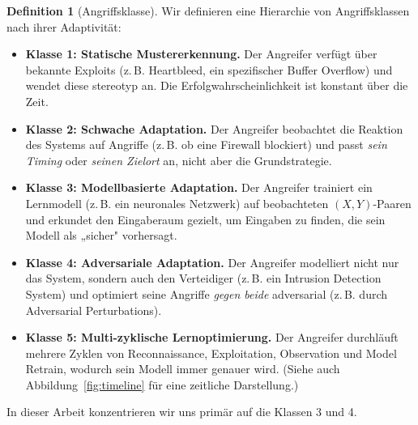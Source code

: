 \documentclass[a4paper,12pt]{article}
\theoremstyle{definition}
\newtheorem{definition}{Definition}
\begin{document}
\begin{definition}[Angriffsklasse]
\label{def:ki_angriffsklasse}
Wir definieren eine Hierarchie von Angriffsklassen nach ihrer Adaptivität:

\begin{itemize}
	\item \textbf{Klasse 1: Statische Mustererkennung.} Der Angreifer verfügt über bekannte Exploits (z.\,B. Heartbleed, ein spezifischer Buffer Overflow) und wendet diese stereotyp an. Die Erfolgwahrscheinlichkeit ist konstant über die Zeit.
	
	\item \textbf{Klasse 2: Schwache Adaptation.} Der Angreifer beobachtet die Reaktion des Systems auf Angriffe (z.\,B. ob eine Firewall blockiert) und passt \emph{sein Timing} oder \emph{seinen Zielort} an, nicht aber die Grundstrategie.
	
	\item \textbf{Klasse 3: Modellbasierte Adaptation.} Der Angreifer trainiert ein Lernmodell (z.\,B. ein neuronales Netzwerk) auf beobachteten $(X, Y)$-Paaren und erkundet den Eingaberaum gezielt, um Eingaben zu finden, die sein Modell als „sicher" vorhersagt.
	
	\item \textbf{Klasse 4: Adversariale Adaptation.} Der Angreifer modelliert nicht nur das System, sondern auch den Verteidiger (z.\,B. ein Intrusion Detection System) und optimiert seine Angriffe \emph{gegen beide} adversarial (z.\,B. durch Adversarial Perturbations).
	
	\item \textbf{Klasse 5: Multi-zyklische Lernoptimierung.} Der Angreifer durchläuft mehrere Zyklen von Reconnaissance, Exploitation, Observation und Model Retrain, wodurch sein Modell immer genauer wird. (Siehe auch Abbildung~\ref{fig:timeline} für eine zeitliche Darstellung.)
\end{itemize}

In dieser Arbeit konzentrieren wir uns primär auf die Klassen 3 und 4.
\end{definition}
\end{document}
